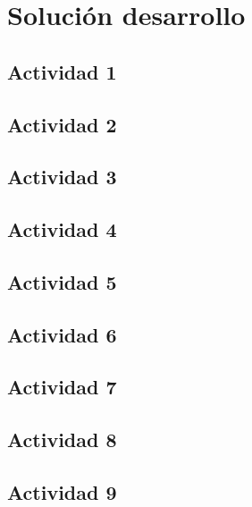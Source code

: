 \section{Solución desarrollo}
\subsection{Actividad 1}
\subsection{Actividad 2}
\subsection{Actividad 3}
\subsection{Actividad 4}
\subsection{Actividad 5}
\subsection{Actividad 6}
\subsection{Actividad 7}
\subsection{Actividad 8}
\subsection{Actividad 9}